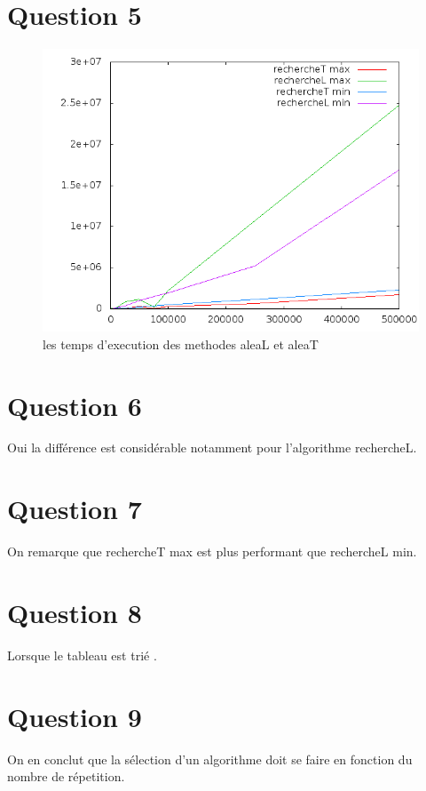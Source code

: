 \documentclass[a4paper,12pt]{report}
\begin{document}
\newpage


\section*{Question 5}
\begin{figure}[!ht]
	\center
	\includegraphics[scale=0.5]{q5.png}
	\caption{les temps d’execution des methodes aleaL et aleaT}
\end{figure}

\section*{Question 6}
Oui la différence est considérable notamment pour l'algorithme rechercheL.

\section*{Question 7}
On remarque que rechercheT max est plus performant que rechercheL min.

\section*{Question 8}
Lorsque le tableau est trié .

\section*{Question 9}
On en conclut que la sélection d'un algorithme doit se faire en fonction du nombre de répetition.

\newpage
\end{document}
